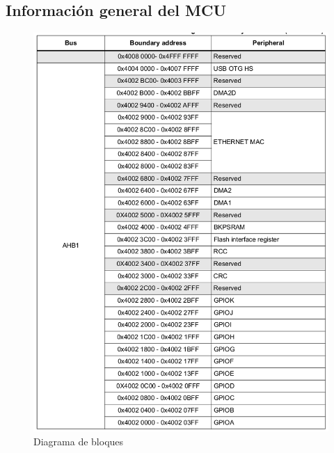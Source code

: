 \subsection{Información general del MCU}

\begin{figure}[H]
\centering
\includegraphics[scale=0.6]{./images/r2.png} 
\caption{Diagrama de bloques \cite{DiscoveryDATASHEET}}
\label{gyro_pins}
\end{figure}


